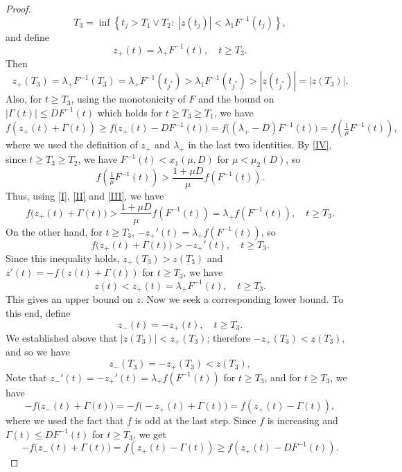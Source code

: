 \documentclass[a4paper,10pt,reqno]{amsart}
\numberwithin{equation}{section}
\theoremstyle{definition}
\theoremstyle{remark}
\DeclareMathOperator{\1}{\mathbbm 1}
\begin{document}
\begin{proof}
		\[
		T_3 = \inf \left\{ t_j > {T_1 \lor T_2}: \; |z(t_j)| < \lambda_1 F^{-1}(t_j) \right\},
		\]
		and define
		\[
		z_+(t) = \lambda_+ F^{-1}(t), \quad t \geq T_3.
		\]
		Then
		\[
		z_+(T_3) = \lambda_+ F^{-1}(T_3) = \lambda_+ F^{-1}(t_{j^*}) > \lambda_1 F^{-1}(t_{j^*}) > |z(t_{j^*})| = |z(T_3)|.
		\]
		Also, for $t \geq T_3$, using the monotonicity of $F$ and the bound on $|\Gamma(t)|\leq DF^{-1}(t)$ which holds for $t\geq T_3\geq T_1$, we have
		\begin{equation} \label{I}
			f(z_+(t) + \Gamma(t)) \geq f\!\big(z_+(t) - D F^{-1}(t)\big)
			=	f\!\big((\lambda_+ - D)F^{-1}(t)\big)= f\!\left(\tfrac{1}{\mu} F^{-1}(t)\right),
		\end{equation}
		where we used the definition of $z_+$ and $\lambda_+$ in the last two identities.
		By \eqref{IV}, since $t \geq T_3 \geq T_2$, we have $F^{-1}(t) < x_1(\mu,D)$ for $\mu < \mu_2(D)$, so
		\begin{equation} \label{II}
			f\!\left(\tfrac{1}{\mu}F^{-1}(t)\right) > \frac{1+\mu D}{\mu} f(F^{-1}(t)). 
		\end{equation} 
		Thus, using \eqref{I}, \eqref{II} and \eqref{III}, we have 
		\[
		f\big(z_+(t) + \Gamma(t)\big) > \frac{1+\mu D}{\mu} f(F^{-1}(t)) 
		= \lambda_+ f(F^{-1}(t)), \quad t\geq T_3. 
		\]
		On the other hand, for $t\geq T_3$, $-z_{+}'(t) = \lambda_{+}f(F^{-1}(t))$, so 
		\[
		f\big(z_{+}(t) + \Gamma(t)\big) > - z_{+}'(t), \quad t \geq T_{3}.
		\]
		Since this inequality holds, $z_+(T_3)>z(T_3)$ and $z'(t)=-f(z(t)+\Gamma(t))$ for $t\geq T_3$, we have 
		\[
		z(t) < z_{+}(t)=\lambda_+ F^{-1}(t), \quad t \geq T_{3}.
		\]
		This gives an upper bound on $z$. Now we seek a corresponding lower bound. To this end, define
		\[
		z_{-}(t) = - z_{+}(t), \quad t \geq T_{3}.
		\]
		We established above that $|z(T_3)|<z_+(T_3)$; therefore $-z_+(T_3)<z(T_3)$, and so we have 
		\[
		z_{-}(T_{3}) = - z_{+}(T_{3}) < z(T_{3}),
		\]
		Note that
		$z_{-}'(t) = - z_{+}'(t) = \lambda_{+} f(F^{-1}(t))$ for $t \geq T_{3}$, and for $t \geq T_{3}$, we have 
		\[
		- f\big(z_{-}(t) + \Gamma(t)\big) 
		= - f\big(- z_{+}(t) + \Gamma(t)\big)=f(z_+(t)-\Gamma(t)),
		\]
		where we used the fact that $f$ is odd at the last step. Since $f$ is increasing and $\Gamma(t) \leq D F^{-1}(t)$ for $t \geq T_{3}$, we get
		\[
		- f\big(z_{-}(t) + \Gamma(t)\big) = f(z_+(t)-\Gamma(t)) \geq f(z_+(t)-DF^{-1}(t)).
\]
\end{proof}
\end{document}
